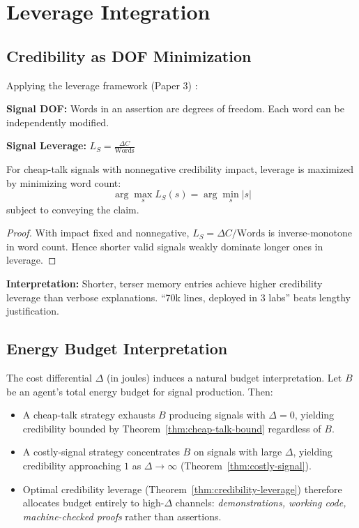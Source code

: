 \section{Leverage Integration}\label{leverage-integration}

\subsection{Credibility as DOF
Minimization}\label{credibility-as-dof-minimization}

Applying the leverage framework (Paper 3) \cite{paper3_leverage}:

\textbf{Signal DOF:} Words in an assertion are degrees of freedom. Each
word can be independently modified.

\textbf{Signal Leverage:} \(L_S = \frac{\Delta C}{\text{Words}}\)

\begin{theorem}\label{thm:credibility-leverage}
For cheap-talk signals with nonnegative credibility impact, leverage is maximized by minimizing word count:
\[
\arg\max_s L_S(s) = \arg\min_s |s|
\]
subject to conveying the claim.

  
\end{theorem}

\begin{proof}
With impact fixed and nonnegative, \(L_S=\Delta C/\text{Words}\) is inverse-monotone in word count.
Hence shorter valid signals weakly dominate longer ones in leverage.
\end{proof}

\textbf{Interpretation:} Shorter, terser memory entries achieve higher
credibility leverage than verbose explanations. ``70k lines, deployed in
3 labs'' beats lengthy justification.

\subsection{Energy Budget Interpretation}\label{energy-budget-interpretation}

The cost differential $\Delta$ (in joules) induces a natural budget interpretation.
Let $B$ be an agent's total energy budget for signal production. Then:

\begin{itemize}
\item A cheap-talk strategy exhausts $B$ producing signals with $\Delta = 0$, yielding
  credibility bounded by Theorem~\ref{thm:cheap-talk-bound} regardless of $B$.
\item A costly-signal strategy concentrates $B$ on signals with large $\Delta$, yielding
  credibility approaching $1$ as $\Delta \to \infty$ (Theorem~\ref{thm:costly-signal}).
\item Optimal credibility leverage (Theorem~\ref{thm:credibility-leverage}) therefore
  allocates budget entirely to high-$\Delta$ channels: \emph{demonstrations, working code,
  machine-checked proofs} rather than assertions.
\end{itemize}

